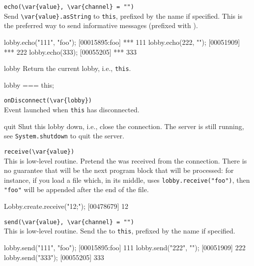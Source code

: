 \begin{urbiscriptapi}
\item \lstinline|echo(\var{value}, \var{channel} = "")|\\
  Send \lstinline|\var{value}.asString| to \lstinline|this|, prefixed
  by the   name if specified.  This is
  the preferred way to send informative messages (prefixed with
  \samp{***}).
\begin{urbiscript}
lobby.echo("111", "foo");
[00015895:foo] *** 111
lobby.echo(222, "");
[00051909] *** 222
lobby.echo(333);
[00055205] *** 333
\end{urbiscript}


\item[lobby]
  Return the current lobby, i.e., \lstinline|this|.
\begin{urbiassert}
lobby === this;
\end{urbiassert}

\item \lstinline|onDisconnect(\var{lobby})|\\
  Event launched when \lstinline|this| has disconnected.

\item[quit] Shut this lobby down, i.e., close the connection.  The
  server is still running, see \lstinline|System.shutdown| to quit the
  server.

\item \lstinline|receive(\var{value})|\\
  This is low-level routine.  Pretend the 
   was received from the connection.  There is no guarantee
  that  will be the next program block that will be
  processed: for instance, if you load a file which, in its middle,
  uses \lstinline|lobby.receive("foo")|, then \lstinline|"foo"| will
  be appended after the end of the file.
\begin{urbiscript}
Lobby.create.receive("12;");
[00478679] 12
\end{urbiscript}

\item \lstinline|send(\var{value}, \var{channel} = "")|\\
  This is low-level routine.  Send the  
  to \lstinline|this|, prefixed by the 
   name if specified.
\begin{urbiscript}
lobby.send("111", "foo");
[00015895:foo] 111
lobby.send("222", "");
[00051909] 222
lobby.send("333");
[00055205] 333
\end{urbiscript}


\end{urbiscriptapi}
